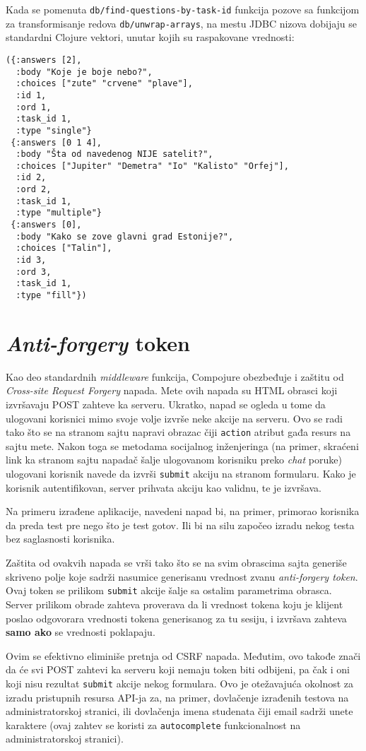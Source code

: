 {Kada se pomenuta \texttt{db/find-questions-by-task-id} funkcija pozove sa funkcijom za transformisanje redova \texttt{db/unwrap-arrays}, na mestu JDBC nizova dobijaju se standardni Clojure vektori, unutar kojih su raspakovane vrednosti:
\begin{verbatim}
({:answers [2],
  :body "Koje je boje nebo?",
  :choices ["zute" "crvene" "plave"],
  :id 1,
  :ord 1,
  :task_id 1,
  :type "single"}
 {:answers [0 1 4],
  :body "Šta od navedenog NIJE satelit?",
  :choices ["Jupiter" "Demetra" "Io" "Kalisto" "Orfej"],
  :id 2,
  :ord 2,
  :task_id 1,
  :type "multiple"}
 {:answers [0],
  :body "Kako se zove glavni grad Estonije?",
  :choices ["Talin"],
  :id 3,
  :ord 3,
  :task_id 1,
  :type "fill"})
\end{verbatim}

\section{\textit{Anti-forgery} token}
Kao deo standardnih \textit{middleware} funkcija, Compojure obezbeđuje i zaštitu od \textit{Cross-site Request Forgery} napada. Mete ovih napada su HTML obrasci koji izvršavaju POST zahteve ka serveru. Ukratko, napad se ogleda u tome da ulogovani korisnici mimo svoje volje izvrše neke akcije na serveru. Ovo se radi tako što se na stranom sajtu napravi obrazac čiji \texttt{action} atribut gađa resurs na sajtu mete. Nakon toga se metodama socijalnog inženjeringa (na primer, skraćeni link ka stranom sajtu napadač šalje ulogovanom korisniku preko \textit{chat} poruke) ulogovani korisnik navede da izvrši \texttt{submit} akciju na stranom formularu. Kako je korisnik autentifikovan, server prihvata akciju kao validnu, te je izvršava.

Na primeru izrađene aplikacije, navedeni napad bi, na primer, primorao korisnika da preda test pre nego što je test gotov. Ili bi na silu započeo izradu nekog testa bez saglasnosti korisnika.

Zaštita od ovakvih napada se vrši tako što se na svim obrascima sajta generiše skriveno polje koje sadrži nasumice generisanu vrednost zvanu \textit{anti-forgery token}. Ovaj token se prilikom \texttt{submit} akcije šalje sa ostalim parametrima obrasca. Server prilikom obrade zahteva proverava da li vrednost tokena koju je klijent poslao odgovorara vrednosti tokena generisanog za tu sesiju, i izvršava zahteva \textbf{samo ako} se vrednosti poklapaju.


Ovim se efektivno eliminiše pretnja od CSRF napada. Međutim, ovo takođe znači da će svi POST zahtevi ka serveru koji nemaju token biti odbijeni, pa čak i oni koji nisu rezultat \texttt{submit} akcije nekog formulara. Ovo je otežavajuća okolnost za izradu pristupnih resursa API-ja za, na primer, dovlačenje izrađenih testova na administratorskoj stranici, ili dovlačenja imena studenata čiji email sadrži unete karaktere (ovaj zahtev se koristi za \texttt{autocomplete} funkcionalnost na administratorskoj stranici).

}
